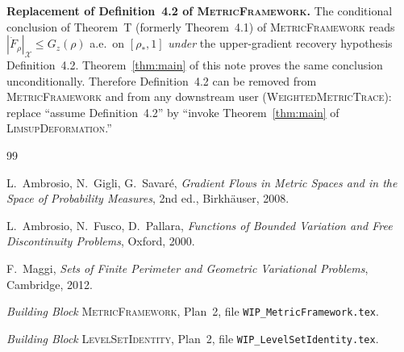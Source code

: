 \documentclass[11pt]{article}
\theoremstyle{definition}
\newcommand{\rstar}{\rho_{*}}
\newcommand{\X}{\mathcal X}
\begin{document}
\smallskip
\textbf{Replacement of Definition~4.2 of \textsc{MetricFramework}.}
The conditional conclusion of Theorem~T (formerly Theorem~4.1) of
\textsc{MetricFramework} reads $|\dot F_\rho|_\X\le G_z(\rho)$ a.e.\ on
$[\rstar,1]$ \emph{under} the upper-gradient recovery hypothesis
Definition~4.2. Theorem~\ref{thm:main} of this note proves the same
conclusion unconditionally. Therefore Definition~4.2 can be removed from
\textsc{MetricFramework} and from any downstream user
(\textsc{WeightedMetricTrace}): replace ``assume Definition~4.2'' by
``invoke Theorem~\ref{thm:main} of \textsc{LimsupDeformation}.''

\begin{thebibliography}{99}

L.~Ambrosio, N.~Gigli, G.~Savar\'e,
\emph{Gradient Flows in Metric Spaces and in the Space of Probability
Measures}, 2nd ed., Birkh\"auser, 2008.

L.~Ambrosio, N.~Fusco, D.~Pallara,
\emph{Functions of Bounded Variation and Free Discontinuity Problems},
Oxford, 2000.

F.~Maggi, \emph{Sets of Finite Perimeter and Geometric Variational
Problems}, Cambridge, 2012.

\emph{Building Block} \textsc{MetricFramework}, Plan~2, file
\texttt{WIP\_MetricFramework.tex}.

\emph{Building Block} \textsc{LevelSetIdentity}, Plan~2, file
\texttt{WIP\_LevelSetIdentity.tex}.

\end{thebibliography}
\end{document}
